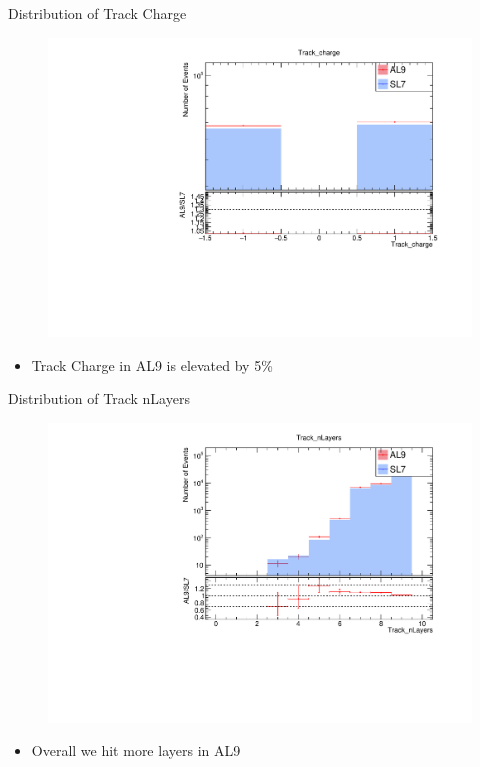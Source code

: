 \begin{frame}{Distribution of Track Charge}
    \begin{figure}
        \includegraphics[width=\linewidth]{./output/Track_charge.pdf}
    \end{figure}
    \vspace{-0.65cm}
        \begin{itemize}
            \item Track Charge in AL9 is elevated by 5\%
        \end{itemize}
\end{frame}

\begin{frame}{Distribution of Track nLayers}
    \begin{figure}
        \includegraphics[width=0.95\linewidth]{./output/Track_nLayers.pdf}
    \end{figure}
    \vspace{-0.65cm}
    \begin{itemize}
        \item Overall we hit more layers in AL9 
    \end{itemize}
\end{frame}

